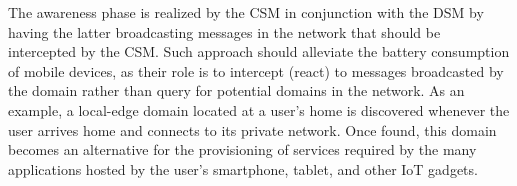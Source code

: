 The awareness phase is realized by the CSM in conjunction with the DSM by having the latter broadcasting messages in the network that should be intercepted by the CSM. 
Such approach should alleviate the battery consumption of mobile devices, as their role is to intercept (react) to messages broadcasted by the domain rather than query for potential domains in the network. As an example, a local-edge domain located at a user's home is discovered whenever the user arrives home and connects to its private network. Once found, this domain becomes an alternative for the provisioning of services required by the many applications hosted by the user's smartphone, tablet, and other IoT gadgets. %






%


%
%
	
